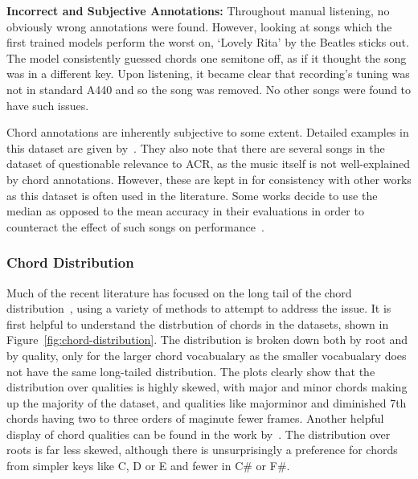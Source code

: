 \textbf{Incorrect and Subjective Annotations:} Throughout manual listening, no obviously wrong annotations were found. However, looking at songs which the first trained models perform the worst on, `Lovely Rita' by the Beatles sticks out. The model consistently guessed chords one semitone off, as if it thought the song was in a different key. Upon listening, it became clear that recording's tuning was not in standard A440 and so the song was removed. No other songs were found to have such issues.

Chord annotations are inherently subjective to some extent. Detailed examples in this dataset are given by~\citet{FourTimelyInsights}. They also note that there are several songs in the dataset of questionable relevance to ACR, as the music itself is not well-explained by chord annotations. However, these are kept in for consistency with other works as this dataset is often used in the literature. Some works decide to use the median as opposed to the mean accuracy in their evaluations in order to counteract the effect of such songs on performance~\citep{StructuredTraining}.

\subsubsection{Chord Distribution}

Much of the recent literature has focused on the long tail of the chord distribution~\citep{BalanceRandomForestACR,CurriculumLearning}, using a variety of methods to attempt to address the issue. It is first helpful to understand the distrbution of chords in the datasets, shown in Figure~\ref{fig:chord-distribution}. The distribution is broken down both by root and by quality, only for the larger chord vocabualary as the smaller vocabualary does not have the same long-tailed distribution. The plots clearly show that the distribution over qualities is highly skewed, with major and minor chords making up the majority of the dataset, and qualities like majorminor and diminished 7th chords having two to three orders of maginute fewer frames. Another helpful display of chord qualities can be found in the work by~\citet{ACRLargeVocab1}. The distribution over roots is far less skewed, although there is unsurprisingly a preference for chords from simpler keys like C, D or E and fewer in C\# or F\#.


